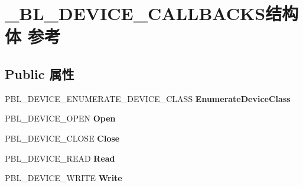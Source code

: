 \hypertarget{struct___b_l___d_e_v_i_c_e___c_a_l_l_b_a_c_k_s}{}\section{\+\_\+\+B\+L\+\_\+\+D\+E\+V\+I\+C\+E\+\_\+\+C\+A\+L\+L\+B\+A\+C\+K\+S结构体 参考}
\label{struct___b_l___d_e_v_i_c_e___c_a_l_l_b_a_c_k_s}
\subsection*{Public 属性}
\begin{DoxyCompactItemize}
\item 
\mbox{\label{struct___b_l___d_e_v_i_c_e___c_a_l_l_b_a_c_k_s_aed853539f72f8ee23d931d2ae0168f41}} 
P\+B\+L\+\_\+\+D\+E\+V\+I\+C\+E\+\_\+\+E\+N\+U\+M\+E\+R\+A\+T\+E\+\_\+\+D\+E\+V\+I\+C\+E\+\_\+\+C\+L\+A\+SS {\bfseries Enumerate\+Device\+Class}
\item 
\mbox{\label{struct___b_l___d_e_v_i_c_e___c_a_l_l_b_a_c_k_s_a74eec2f294468883f3ffd69afb740c91}} 
P\+B\+L\+\_\+\+D\+E\+V\+I\+C\+E\+\_\+\+O\+P\+EN {\bfseries Open}
\item 
\mbox{\label{struct___b_l___d_e_v_i_c_e___c_a_l_l_b_a_c_k_s_a86b7447e47069564229d9e44954fb373}} 
P\+B\+L\+\_\+\+D\+E\+V\+I\+C\+E\+\_\+\+C\+L\+O\+SE {\bfseries Close}
\item 
\mbox{\label{struct___b_l___d_e_v_i_c_e___c_a_l_l_b_a_c_k_s_a342e3405fc7a8bb2ce2c15b875779e77}} 
P\+B\+L\+\_\+\+D\+E\+V\+I\+C\+E\+\_\+\+R\+E\+AD {\bfseries Read}
\item 
\mbox{\label{struct___b_l___d_e_v_i_c_e___c_a_l_l_b_a_c_k_s_a0727f90670864f143c02e0ad85e10c2c}} 
P\+B\+L\+\_\+\+D\+E\+V\+I\+C\+E\+\_\+\+W\+R\+I\+TE {\bfseries Write}
\item 
\mbox{\label{struct___b_l___d_e_v_i_c_e___c_a_l_l_b_a_c_k_s_a4f1c61ab09000d72f47470dd6ae4d17b}} 

\end{DoxyCompactItemize}
